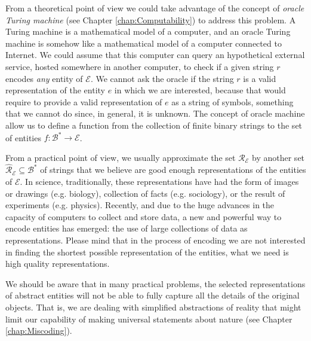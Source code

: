 From a theoretical point of view we could take advantage of the concept of \emph{oracle Turing machine} (see Chapter \ref{chap:Computability}) to address this problem. A Turing machine is a mathematical model of a computer, and an oracle Turing machine is somehow like a mathematical model of a computer connected to Internet. We could assume that this computer can query an hypothetical external service, hosted somewhere in another computer, to check if a given string $r$ encodes \emph{any} entity of $\mathcal{E}$. We cannot ask the oracle if the string $r$ is a valid representation of the entity $e$ in which we are interested, because that would require to provide a valid representation of $e$ as a string of symbols, something that we cannot do since, in general, it is unknown. The concept of oracle machine allow us to define a function from the collection of finite binary strings to the set of entities $f:\mathcal{B}^\ast \rightarrow \mathcal{E}$.

From a practical point of view, we usually approximate the set $\mathcal{R}_\mathcal{E}$ by another set $\hat{\mathcal{R}}_\mathcal{E} \subseteq \mathcal{B}^\ast$ of strings that we believe are good enough representations of the entities of $\mathcal{E}$. In science, traditionally, these representations have had the form of images or drawings (e.g. biology), collection of facts (e.g. sociology), or the result of experiments (e.g. physics). Recently, and due to the huge advances in the capacity of computers to collect and store data, a new and powerful way to encode entities has emerged: the use of large collections of data as representations. Please mind that in the process of encoding we are not interested in finding the shortest possible representation of the entities, what we need is high quality representations.

We should be aware that in many practical problems, the selected representations of abstract entities will not be able to fully capture all the details of the original objects. That is, we are dealing with simplified abstractions of reality that might limit our capability of making universal statements about nature (see Chapter \ref{chap:Miscoding}).

